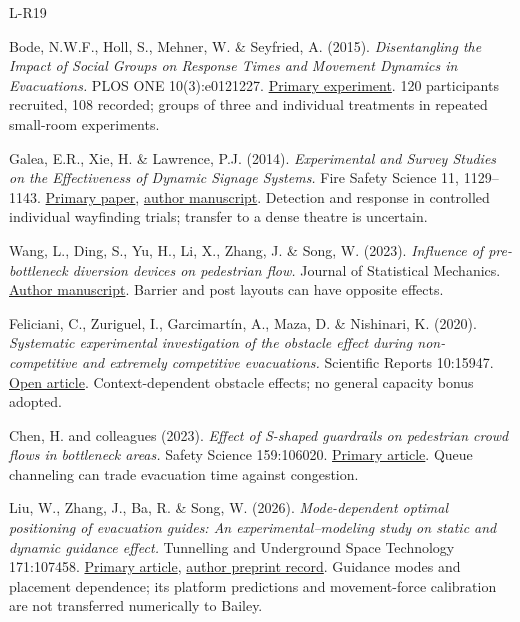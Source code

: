 \documentclass[11pt,a4paper]{article}
\begin{document}
\clearpage
\begin{thebibliography}{L-R19}
 Bode, N.W.F., Holl, S., Mehner, W. \& Seyfried, A. (2015). \emph{Disentangling the Impact of Social Groups on Response Times and Movement Dynamics in Evacuations.} PLOS ONE 10(3):e0121227. \href{https://doi.org/10.1371/journal.pone.0121227}{Primary experiment}. 120 participants recruited, 108 recorded; groups of three and individual treatments in repeated small-room experiments.

 Galea, E.R., Xie, H. \& Lawrence, P.J. (2014). \emph{Experimental and Survey Studies on the Effectiveness of Dynamic Signage Systems.} Fire Safety Science 11, 1129–1143. \href{https://doi.org/10.3801/IAFSS.FSS.11-1129}{Primary paper}, \href{https://gala.gre.ac.uk/id/eprint/14393/1/14393_GALEA_Dynamic_Signage_Systems_2014.pdf}{author manuscript}. Detection and response in controlled individual wayfinding trials; transfer to a dense theatre is uncertain.

 Wang, L., Ding, S., Yu, H., Li, X., Zhang, J. \& Song, W. (2023). \emph{Influence of pre-bottleneck diversion devices on pedestrian flow.} Journal of Statistical Mechanics. \href{https://arxiv.org/abs/2212.01296}{Author manuscript}. Barrier and post layouts can have opposite effects.

 Feliciani, C., Zuriguel, I., Garcimartín, A., Maza, D. \& Nishinari, K. (2020). \emph{Systematic experimental investigation of the obstacle effect during non-competitive and extremely competitive evacuations.} Scientific Reports 10:15947. \href{https://pmc.ncbi.nlm.nih.gov/articles/PMC7525554/}{Open article}. Context-dependent obstacle effects; no general capacity bonus adopted.

 Chen, H. and colleagues (2023). \emph{Effect of S-shaped guardrails on pedestrian crowd flows in bottleneck areas.} Safety Science 159:106020. \href{https://doi.org/10.1016/j.ssci.2022.106020}{Primary article}. Queue channeling can trade evacuation time against congestion.

 Liu, W., Zhang, J., Ba, R. \& Song, W. (2026). \emph{Mode-dependent optimal positioning of evacuation guides: An experimental–modeling study on static and dynamic guidance effect.} Tunnelling and Underground Space Technology 171:107458. \href{https://doi.org/10.1016/j.tust.2026.107458}{Primary article}, \href{https://papers.ssrn.com/sol3/papers.cfm?abstract_id=5532949}{author preprint record}. Guidance modes and placement dependence; its platform predictions and movement-force calibration are not transferred numerically to Bailey.


\end{thebibliography}
\end{document}
